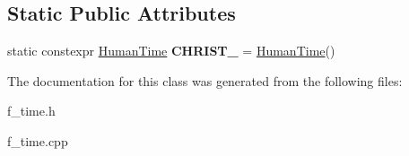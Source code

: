 \subsection*{Static Public Attributes}
\begin{DoxyCompactItemize}
\item 
\mbox{\label{classtime_1_1_extended_metric_time_a4ef8819205bdff9cada5d32fae722037}} 
static constexpr \mbox{\hyperlink{classtime_1_1_human_time}{Human\+Time}} {\bfseries C\+H\+R\+I\+S\+T\+\_} = \mbox{\hyperlink{classtime_1_1_human_time}{Human\+Time}}()
\end{DoxyCompactItemize}


The documentation for this class was generated from the following files\+:\begin{DoxyCompactItemize}
\item 
f\+\_\+time.\+h\item 
f\+\_\+time.\+cpp\end{DoxyCompactItemize}
